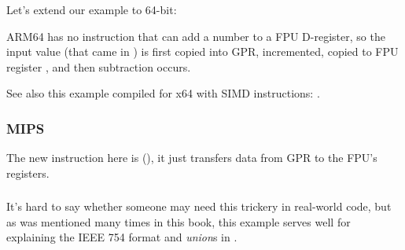 Let's extend our example to 64-bit:



ARM64 has no instruction that can add a number to a FPU D-register, 
so the input value (that came in ) is first copied into \ac{GPR},
incremented, copied to FPU register , and then subtraction occurs.



See also this example compiled for x64 with SIMD instructions: .

\subsubsection{MIPS}


The new instruction here is  (), it just transfers data from \ac{GPR} to the FPU's registers.



\subsubsection{\Conclusion}

It's hard to say whether someone may need this trickery in real-world code, 
but as was mentioned many times in this book, this example serves well 
for explaining the IEEE 754 format and \emph{union}s in \CCpp.

